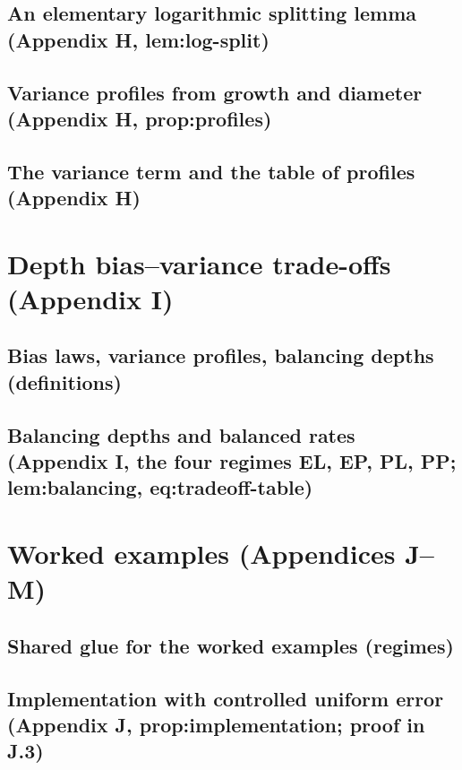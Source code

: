 \section{An elementary logarithmic splitting lemma (Appendix H, lem:log-split)}

\section{Variance profiles from growth and diameter (Appendix H, prop:profiles)}

\section{The variance term and the table of profiles (Appendix H)}

\chapter{Depth bias--variance trade-offs (Appendix I)}

\section{Bias laws, variance profiles, balancing depths (definitions)}

\section{Balancing depths and balanced rates (Appendix I, the four regimes EL, EP, PL, PP; lem:balancing, eq:tradeoff-table)}

\chapter{Worked examples (Appendices J--M)}

\section{Shared glue for the worked examples (regimes)}

\section{Implementation with controlled uniform error (Appendix J, prop:implementation; proof in J.3)}

